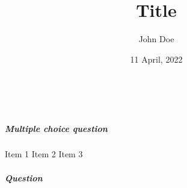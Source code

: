 \documentclass[
]{exam}
\title{Title}
\author{John Doe}
\date{11 April, 2022}
\providecommand{\tightlist}{%
  \setlength{\itemsep}{0pt}\setlength{\parskip}{0pt}}
\let\origitem\item
\let\origitemize\itemize
\let\origenditemize\enditemize
\newcommand{\restoreitemize}{
  \let\itemize\origitemize
  \let\enditemize\origenditemize
  \let\item\origitem
}
\newcommand{\opc}[1]{
  \ifstrequal{#1}{on}{
    \let\itemize\oneparchoices
    \let\enditemize\endoneparchoices
    \def\item{\choice}
  }{\restoreitemize}
}
\newcounter{q}%
\begin{document}
\maketitle

\begin{mdframed}[roundcorner = 2pt, linewidth = 1pt]
\vspace{0.1in}
\\[12pt]
\vspace{0.2in}
\end{mdframed}

\hypertarget{multiple-choice-question}{%
\subparagraph{Multiple choice question}\label{multiple-choice-question}}

\opc{on}

\begin{itemize}
\tightlist
\item
  Item 1
\item
  Item 2
\item
  Item 3
\end{itemize}

\opc{off}

\hypertarget{question}{%
\subparagraph{Question}\label{question}}

\fillwithdottedlines{0.5in}\vspace{2em}
\end{document}
